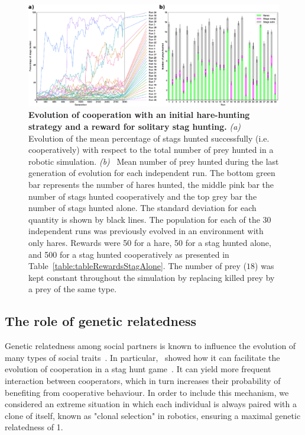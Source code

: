     \begin{figure}[h]
      \centerfloat
        \includegraphics[scale = 0.9]{fig/ArticleBio1/Fig6.eps}
      \caption{\textbf{Evolution of cooperation with an initial hare-hunting strategy and a reward for solitary stag hunting.}
      {\em (a)}~ Evolution of the mean percentage of stags hunted successfully (i.e. cooperatively) with respect to the total number of prey hunted in a robotic simulation. {\em (b)}~ Mean number of prey hunted during the last generation of evolution for each independent run. The bottom green bar represents the number of hares hunted, the middle pink bar the number of stags hunted cooperatively and the top grey bar the number of stags hunted alone. The standard deviation for each quantity is shown by black lines. The population for each of the 30 independent runs was previously evolved in an environment with only hares. Rewards were 50 for a hare, 50 for a stag hunted alone, and 500 for a stag hunted cooperatively as presented in Table~\ref{table:tableRewardsStagAlone}. The number of prey ($18$) was kept constant throughout the simulation by replacing killed prey by a prey of the same type.}
      \label{fig:graphSolo}
    \end{figure}


  \subsection{The role of genetic relatedness}
    Genetic relatedness among social partners is known to influence the evolution of many types of social traits~\parencite{Hamilton1964}. In particular,~\parencite{Skyrms2004} showed how it can facilitate the evolution of cooperation in a stag hunt game~\parencite[chapter 3]{Skyrms2004}. It can yield more frequent interaction between cooperators, which in turn increases their probability of benefiting from cooperative behaviour. In order to include this mechanism, we considered an extreme situation in which each individual is always paired with a clone of itself, known as "clonal selection" in robotics, ensuring a maximal genetic relatedness of 1.

